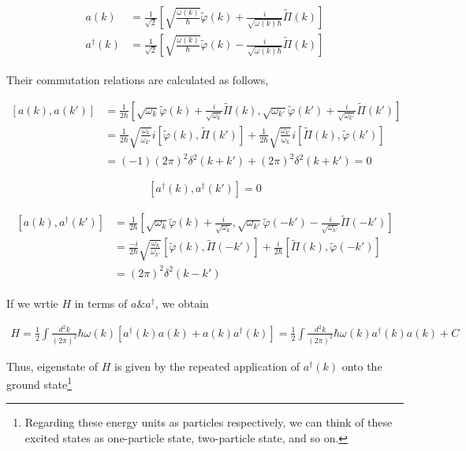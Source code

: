 \begin{align}
\begin{split}
a(k) &= \frac{1}{\sqrt{2}}\left[\sqrt{\frac{\omega(k)}{\hbar}}\tilde{\varphi}(k)+\frac{i}{\sqrt{\omega(k)\hbar}}\tilde{\Pi}(k)\right]\\
a^\dagger(k) &= \frac{1}{\sqrt{2}}\left[\sqrt{\frac{\omega(k)}{\hbar}}\tilde{\varphi}(k)-\frac{i}{\sqrt{\omega(k)\hbar}}\tilde{\Pi}(k)\right]
\end{split}
\end{align}

Their commutation relations are calculated as follows, 

\[\begin{split}
[a(k),a(k')] &= \frac{1}{2\hbar}\left[\sqrt{\omega_k}\tilde{\varphi}(k)+\frac{i}{\sqrt{\omega_k}} \tilde{\Pi}(k), \sqrt{\omega_{k'}}\tilde{\varphi}(k')+\frac{i}{\sqrt{\omega_{k'}}}\tilde{\Pi}(k')\right] \\
&= \frac{1}{2\hbar}\sqrt{\frac{\omega_k}{\omega_{k'}}}i[\tilde{\varphi}(k),\tilde{\Pi}(k')] + \frac{1}{2\hbar}\sqrt{\frac{\omega_{k'}}{\omega_k}}i[\tilde{\Pi}(k),\tilde{\varphi}(k')] \\
&=(-1)(2\pi)^2\delta^2(k+k')+(2\pi)^2\delta^2(k+k')= 0 
\end{split}\]

\[[a^\dagger(k),a^\dagger(k')] = 0 \]

\begin{align}\begin{split}
[a(k),a^\dagger(k')] &= \frac{1}{2\hbar}\left[\sqrt{\omega_k}\tilde{\varphi}(k)+\frac{i}{\sqrt{\omega_k}}, \sqrt{\omega_{k'}}\tilde{\varphi}(-k') - \frac{i}{\sqrt{\omega_{k'}}}\tilde{\Pi}(-k')\right] \\
&= \frac{-i}{2\hbar}\sqrt{\frac{\omega_k}{\omega_{k'}}} [\tilde{\varphi}(k),\tilde{\Pi}(-k')] + \frac{i}{2\hbar}[\tilde{\Pi}(k),\tilde{\varphi}(-k')] \\
&= (2\pi)^2\delta^2(k-k')
\end{split}\end{align}

If we wrtie $H$ in terms of $a \& a^\dagger$, we obtain

\begin{align}
H = \frac{1}{2}\int \frac{d^2 k}{(2\pi)^2}\hbar\omega(k)[a^\dagger(k)a(k)+a(k)a^\dagger(k)] = \frac{1}{2}\int \frac{d^2 k}{(2\pi)^2}\hbar\omega(k)a^\dagger(k)a(k)+C
\end{align}

Thus, eigenstate of $H$ is given by the repeated application of $a^\dagger(k)$ onto the ground state\footnote{Regarding these energy units as particles respectively, we can think of these excited states as one-particle state, two-particle state, and so on. }

